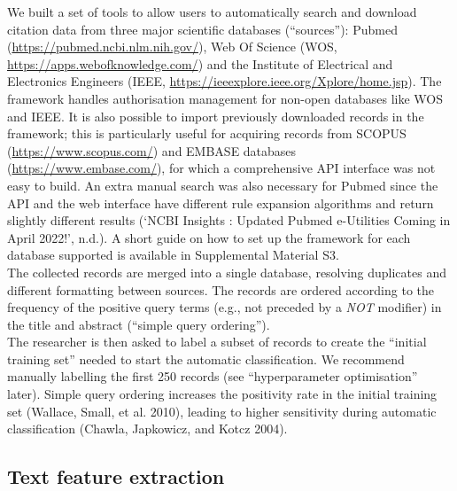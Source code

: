 \documentclass{article}
\begin{document}
We built a set of tools to allow users to automatically search and
download citation data from three major scientific databases
(``sources''): Pubmed (\url{https://pubmed.ncbi.nlm.nih.gov/}), Web Of
Science (WOS, \url{https://apps.webofknowledge.com/}) and the Institute
of Electrical and Electronics Engineers (IEEE,
\url{https://ieeexplore.ieee.org/Xplore/home.jsp}). The framework
handles authorisation management for non-open databases like WOS and
IEEE. It is also possible to import previously downloaded records in the
framework; this is particularly useful for acquiring records from SCOPUS
(\url{https://www.scopus.com/}) and EMBASE databases
(\url{https://www.embase.com/}), for which a comprehensive API interface
was not easy to build. An extra manual search was also necessary for
Pubmed since the API and the web interface have different rule expansion
algorithms and return slightly different results ({`NCBI Insights :
Updated Pubmed e-Utilities Coming in April 2022!'}, n.d.). A short guide
on how to set up the framework for each database supported is available
in Supplemental Material S3.\\
The collected records are merged into a single database, resolving
duplicates and different formatting between sources. The records are
ordered according to the frequency of the positive query terms (e.g.,
not preceded by a \emph{NOT} modifier) in the title and abstract
(``simple query ordering'').\\
The researcher is then asked to label a subset of records to create the
``initial training set'' needed to start the automatic classification.
We recommend manually labelling the first 250 records (see
``hyperparameter optimisation'' later). Simple query ordering increases
the positivity rate in the initial training set (Wallace, Small, et al.
2010), leading to higher sensitivity during automatic classification
(Chawla, Japkowicz, and Kotcz 2004).

\hypertarget{text-feature-extraction}{%
\subsection{Text feature extraction}\label{text-feature-extraction}}
\end{document}
